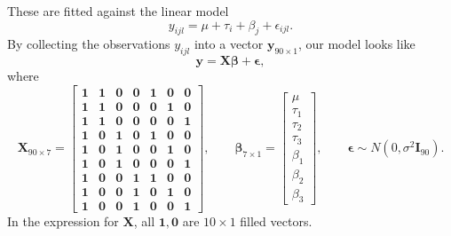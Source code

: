 \documentclass[10pt]{article}
\renewcommand{\vec}{\bm}
\begin{document}
    These are fitted against the linear model \[
        y_{ijl} = \mu + \tau_i + \beta_j + \epsilon_{ijl}.
    \] By collecting the observations $y_{ijl}$ into a vector $\vec{y}_{90\times 1}$,
    our model looks like \[
        \vec{y} = \vec{X}\vec{\beta} + \vec{\epsilon},
    \] where \[
        \vec{X}_{90\times 7} = \begin{bmatrix}
            \vec{1} & \vec{1} & \vec{0} & \vec{0} & \vec{1} & \vec{0} & \vec{0} \\
            \vec{1} & \vec{1} & \vec{0} & \vec{0} & \vec{0} & \vec{1} & \vec{0} \\
            \vec{1} & \vec{1} & \vec{0} & \vec{0} & \vec{0} & \vec{0} & \vec{1} \\
            \vec{1} & \vec{0} & \vec{1} & \vec{0} & \vec{1} & \vec{0} & \vec{0} \\
            \vec{1} & \vec{0} & \vec{1} & \vec{0} & \vec{0} & \vec{1} & \vec{0} \\
            \vec{1} & \vec{0} & \vec{1} & \vec{0} & \vec{0} & \vec{0} & \vec{1} \\
            \vec{1} & \vec{0} & \vec{0} & \vec{1} & \vec{1} & \vec{0} & \vec{0} \\
            \vec{1} & \vec{0} & \vec{0} & \vec{1} & \vec{0} & \vec{1} & \vec{0} \\
            \vec{1} & \vec{0} & \vec{0} & \vec{1} & \vec{0} & \vec{0} & \vec{1}
        \end{bmatrix}, \qquad
        \vec{\beta}_{7\times 1} = \begin{bmatrix}
            \mu \\ \tau_1 \\ \tau_2 \\ \tau_3 \\ \beta_1 \\ \beta_2 \\ \beta_3
        \end{bmatrix}, \qquad
        \vec{\epsilon} \sim N(0, \sigma^2 \vec{I}_{90}).
    \] In the expression for $\vec{X}$, all $\vec{1}, \vec{0}$ are $10 \times 1$
    filled vectors.
\end{document}
